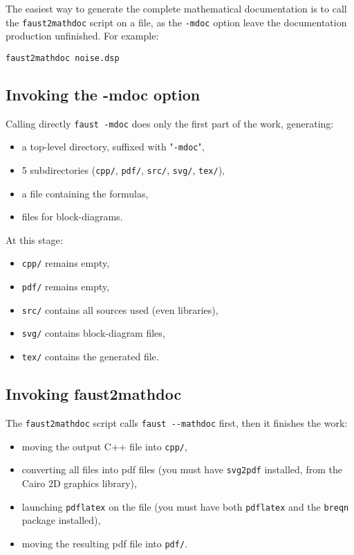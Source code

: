 The easiest way to generate the complete mathematical documentation is to call the \lstinline!faust2mathdoc! script on a \faust file, as the \lstinline!-mdoc! option leave the documentation production unfinished. For example: 
\begin{lstlisting}
faust2mathdoc noise.dsp
\end{lstlisting}

\subsection{Invoking the -mdoc option}
\label{sec:invoking-mdoc}

Calling directly \lstinline!faust -mdoc! does only the first part of the work, generating:
\begin{itemize}
\item a top-level directory, suffixed with "\texttt{-mdoc}",
\item 5 subdirectories (\lstinline!cpp/!, \lstinline!pdf/!, \lstinline!src/!, \lstinline!svg/!, \lstinline!tex/!),
\item a \latex file containing the formulas,
\item \svg files for block-diagrams.
\end{itemize}

At this stage:
\begin{itemize}
\item \lstinline!cpp/! remains empty,
\item \lstinline!pdf/! remains empty,
\item \lstinline!src/! contains all \faust sources used (even libraries),
\item \lstinline!svg/! contains \svg block-diagram files,
\item \lstinline!tex/! contains the generated \latex file.
\end{itemize}

\subsection{Invoking faust2mathdoc}
\label{sec:invok-faust2m}

The \lstinline!faust2mathdoc! script calls \lstinline!faust --mathdoc! first, then it finishes the work:
\begin{itemize}
\item moving the output C++ file into \lstinline!cpp/!,
\item converting all \svg files into pdf files (you must have \lstinline!svg2pdf! installed, from the Cairo 2D graphics library),
\item launching \lstinline!pdflatex! on the \latex file (you must have both \lstinline!pdflatex! and the \lstinline!breqn! package installed),
\item moving the resulting pdf file into \lstinline!pdf/!.
\end{itemize}

